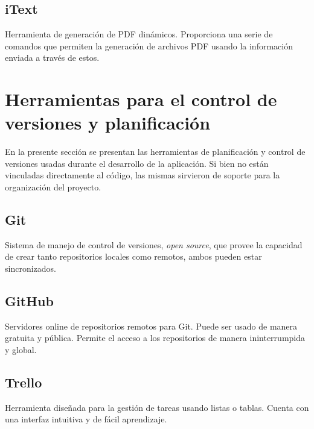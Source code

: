         \subsection{iText}
        \label{tecno-itext}
        
        Herramienta de generación de PDF dinámicos\cite{ITEXT-basico}. Proporciona una serie de comandos que permiten la generación de archivos PDF usando la información enviada a través de estos.
        
    \section{Herramientas para el control de versiones y planificación}
    
    En la presente sección se presentan las herramientas de planificación y control de versiones usadas durante el desarrollo de la aplicación. Si bien no están vinculadas directamente al código, las mismas sirvieron de soporte para la organización del proyecto.
    
        \subsection{Git}
        \label{tecno-git}
        
        Sistema de manejo de control de versiones, \textit{open source}, que provee la capacidad de crear tanto repositorios locales como remotos, ambos pueden estar sincronizados.
        
        \subsection{GitHub}
        \label{tecno-github}
        
        Servidores online de repositorios remotos para Git. Puede ser usado de manera gratuita y pública. Permite el acceso a los repositorios de manera ininterrumpida y global.
        
        \subsection{Trello}
        \label{tecno-trello}
        
        Herramienta diseñada para la gestión de tareas usando listas o tablas. Cuenta con una interfaz intuitiva y de fácil aprendizaje.
        
        
        
    
\pagebreak
